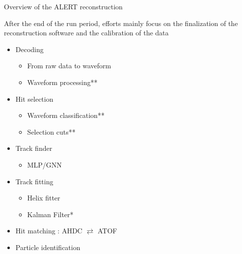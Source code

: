 \documentclass[10pt,aspectratio=43]{beamer}
\begin{document}
\begin{frame}{Overview of the ALERT reconstruction}

    After the end of the run period, efforts mainly focus on the finalization of the reconstruction software and the calibration of the data


    \vspace{0.4cm}
    \centering

    \begin{minipage}{0.45\linewidth}
        \begin{itemize}
            \item Decoding
                \begin{itemize}
                    \item From raw data to waveform
                    \item Waveform processing**
                \end{itemize}
            \item Hit selection
                \begin{itemize}
                    \item Waveform classification**
                    \item Selection cuts**
                \end{itemize}
            \item Track finder
                \begin{itemize}
                    \item MLP/GNN
                \end{itemize}
            \item Track fitting
                \begin{itemize}
                    \item Helix fitter
                    \item Kalman Filter*
                \end{itemize}
            \item Hit matching : AHDC $\rightleftarrows$ ATOF
            \item Particle identification
        \end{itemize}

\end{minipage}
\end{frame}
\end{document}
